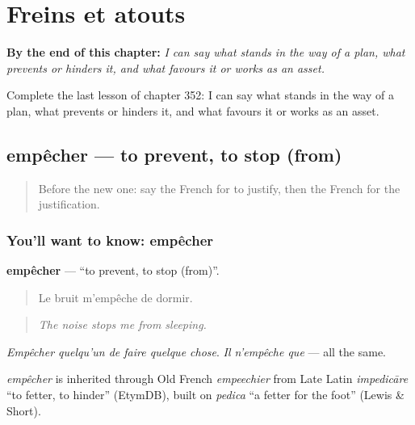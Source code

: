 
\chapter{Freins et atouts}
\label{ch:fr-freins-et-atouts}

\begin{chapteropening}
\textbf{By the end of this chapter:} \emph{I can say what stands in the way of a plan, what prevents or hinders it, and what favours it or works as an asset.}

Complete the last lesson of chapter 352: I can say what stands in the way of a plan, what prevents or hinders it, and what favours it or works as an asset.
\end{chapteropening}

\section[empêcher]{empêcher — to prevent, to stop (from)}

\label{lesson:FR-C352-empecher}



\begin{quote}
Before the new one: say the French for to justify, then the French for the justification.
\end{quote}

\subsection*{You'll want to know: empêcher}
\textbf{empêcher} — \textquotedblleft{}to prevent, to stop (from)\textquotedblright{}.

\begin{quote}
Le bruit m'empêche de dormir.
\end{quote}

\begin{quote}
\emph{The noise stops me from sleeping.}
\end{quote}

\emph{Empêcher quelqu'un de faire quelque chose}. \emph{Il n'empêche que} — all the same.

\begin{cousinweb}
\emph{empêcher} is inherited through Old French \emph{empeechier} from Late Latin \emph{impedicāre} \textquotedblleft{}to fetter, to hinder\textquotedblright{} (EtymDB), built on \emph{pedica} \textquotedblleft{}a fetter for the foot\textquotedblright{} (Lewis \& Short).
\end{cousinweb}

